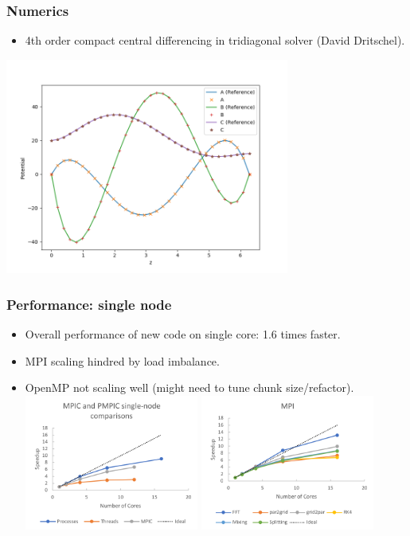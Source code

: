 \documentclass{beamer}
\begin{document}
\begin{frame}
\frametitle{Numerics}
\begin{itemize}
\item 4th order compact central differencing in tridiagonal solver (David Dritschel).
\end{itemize}

\includegraphics[width=0.70\textwidth]{pmpic_images/solution.png} 

\end{frame}

\begin{frame}
\frametitle{Performance: single node}

\begin{itemize}
\item Overall performance of new code on single core: 1.6 times faster.
\item MPI scaling hindred by load imbalance.
\item OpenMP not scaling well (might need to tune chunk size/refactor).
\includegraphics[width=0.45\textwidth]{pmpic_images/singleNode.png} 
\includegraphics[width=0.45\textwidth]{pmpic_images/MPISingle.png} 
\end{itemize}

\end{frame}
\end{document}
